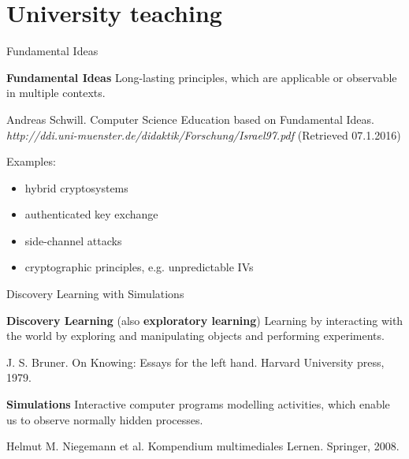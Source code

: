 \section{University teaching}
%

\begin{frame}{Fundamental Ideas}

	\begin{block}{\textbf{Fundamental Ideas}}
	Long-lasting principles, which are applicable or observable in multiple contexts.
		\begin{flushright}
		\tiny \color{svsgrau2}Andreas Schwill. Computer Science Education based on Fundamental Ideas. \textit{http://ddi.uni-muenster.de/didaktik/Forschung/Israel97.pdf} (Retrieved 07.1.2016)
		\end{flushright}
	\end{block}
	
	Examples:

	\pause

	\begin{itemize}
		\item hybrid cryptosystems
		\pause
		\item authenticated key exchange
		\pause
		\item side-channel attacks
		\pause
		\item cryptographic principles, e.g. unpredictable IVs
	\end{itemize}
\end{frame}

\begin{frame}{Discovery Learning with Simulations}
	
	\begin{block}{\textbf{Discovery Learning} (also \textbf{exploratory learning})}
	Learning by interacting with the world by exploring and manipulating objects and performing experiments.
		\begin{flushright}
		\tiny \color{svsgrau2} J. S. Bruner. On Knowing: Essays for the left hand. Harvard University press, 1979.
		\end{flushright}
	\end{block}

\vspace{1cm}
\pause

	\begin{block}{\textbf{Simulations}}
	Interactive computer programs modelling activities, which enable us to observe normally hidden processes.
		\begin{flushright}
		\tiny  \color{svsgrau2} Helmut M. Niegemann et al. Kompendium multimediales Lernen. Springer, 2008.
		\end{flushright}
	\end{block}

\end{frame}


